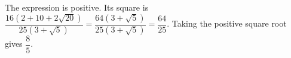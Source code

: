 The expression is positive. Its square is $\dfrac{16(2+10+2\sqrt{20})}{25(3+\sqrt5)}=\dfrac{64(3+\sqrt5)}{25(3+\sqrt5)}=\dfrac{64}{25}$. Taking the positive square root gives $\boxed{\dfrac{8}{5}}$.
